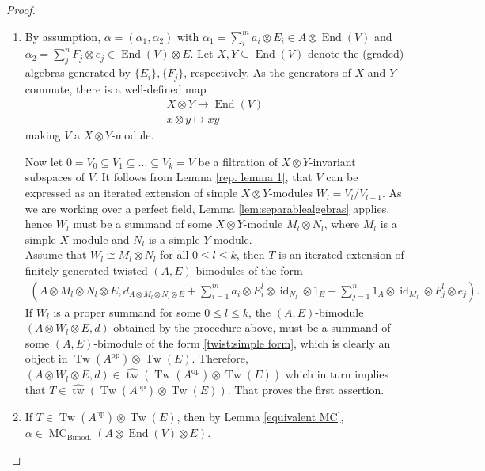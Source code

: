 \documentclass[a4paper]{amsart}
\theoremstyle{plain}
\theoremstyle{definition}
\theoremstyle{remark}
\DeclareMathOperator{\End}{End}
\DeclareMathOperator{\MC}{MC}
\DeclareMathOperator{\tw}{tw}
\DeclareMathOperator{\Tw}{Tw}
\newcommand{\op}{\mathrm{op}}
\numberwithin{equation}{section}
\theoremstyle{plain}
\begin{document}
	\begin{proof}
		\begin{enumerate}
			\item[(1)] By assumption, $\alpha=(\alpha_1,\alpha_2)$ with $\alpha_1=\sum^m_i a_i\otimes E_i\in A\otimes \End(V)$ and $\alpha_2=\sum^n_j F_j\otimes e_j\in \End(V)\otimes E$. Let $X, Y\subseteq \End(V)$ denote the (graded) algebras generated by $\{E_i\},\{F_j\}$, respectively. As the generators of $X$ and $Y$ commute, there is a well-defined map
			\begin{align*}
				X\otimes Y\to \End(V)\\
				x\otimes y\mapsto xy
			\end{align*}
			making $V$ a $X\otimes Y$-module.
			
			Now let $0=V_0\subseteq V_1\subseteq ...\subseteq V_k=V$ be a filtration of $X\otimes Y$-invariant subspaces of $V$.
			It follows from Lemma \ref{rep. lemma 1}, 
			that $V$ can be expressed as an iterated extension of simple $X\otimes Y$-modules $W_l=V_l/V_{l-1}$. As we are working over a perfect field, Lemma \ref{lem:separablealgebras} applies, hence $W_l$ must be a summand of some $X\otimes Y$-module $M_l\otimes N_l$, where $M_l$ is a simple $X$-module and $N_l$ is a simple $Y$-module.
			\\Assume that $W_l\cong M_l\otimes N_l$ for all $0\leq l\leq k$, then $T$ is an iterated extension of finitely generated twisted $(A,E)$-bimodules of the form 
			\begin{align}
				\left(A\otimes M_l\otimes N_l\otimes E,d_{A\otimes M_l\otimes N_l\otimes E}+\sum^m_{i=1} a_i\otimes E^l_i\otimes \operatorname{id}_{N_l}\otimes 1_E+\sum^n_{j=1} 1_A\otimes \operatorname{id}_{M_l}\otimes F^l_j\otimes e_j\right).\label{twist:simple form}
			\end{align}
			If $W_l$ is a proper summand for some $0\leq l\leq k$, the $(A,E)$-bimodule $(A\otimes W_l\otimes E,d)$ obtained by the procedure above, must be a summand of some $(A,E)$-bimodule of the form \ref{twist:simple form}, which is clearly an object in $\Tw(A^\op)\otimes \Tw(E)$. Therefore, $(A\otimes W_l\otimes E,d)\in \widehat{\tw}(\Tw(A^\op)\otimes \Tw(E))$ which in turn implies that $T\in \widehat{\tw}(\Tw(A^\op)\otimes \Tw(E))$. That proves the first assertion.
			\item[(2)] If $T\in \Tw(A^\op)\otimes \Tw(E)$, then by Lemma \ref{equivalent MC}, $\alpha\in \MC_\text{Bimod.}(A\otimes \End(V)\otimes E)$.
		\end{enumerate}
	\end{proof}
\end{document}
